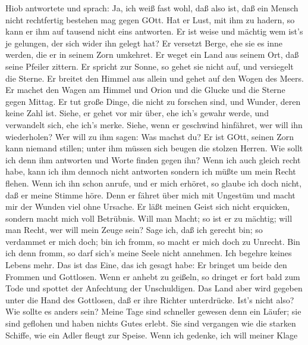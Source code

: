  Hiob antwortete und sprach:  Ja, ich weiß fast
wohl, daß also ist, daß ein Mensch nicht rechtfertig bestehen mag gegen
GOtt.  Hat er Lust, mit ihm zu hadern, so kann er ihm auf
tausend nicht eins antworten.  Er ist weise und mächtig wem
ist's je gelungen, der sich wider ihn gelegt hat?  Er
versetzt Berge, ehe sie es inne werden, die er in seinem Zorn umkehret.
 Er weget ein Land aus seinem Ort, daß seine Pfeiler
zittern.  Er spricht zur Sonne, so gehet sie nicht auf, und
versiegelt die Sterne.  Er breitet den Himmel aus allein und
gehet auf den Wogen des Meers.  Er machet den Wagen am
Himmel und Orion und die Glucke und die Sterne gegen Mittag.
 Er tut große Dinge, die nicht zu forschen sind, und
Wunder, deren keine Zahl ist.  Siehe, er gehet vor mir
über, ehe ich's gewahr werde, und verwandelt sich, ehe ich's merke.
 Siehe, wenn er geschwind hinfähret, wer will ihn
wiederholen? Wer will zu ihm sagen: Was machst du?  Er ist
GOtt, seinen Zorn kann niemand stillen; unter ihm müssen sich beugen die
stolzen Herren.  Wie sollt ich denn ihm antworten und Worte
finden gegen ihn?  Wenn ich auch gleich recht habe, kann
ich ihm dennoch nicht antworten sondern ich müßte um mein Recht flehen.
 Wenn ich ihn schon anrufe, und er mich erhöret, so glaube
ich doch nicht, daß er meine Stimme höre.  Denn er fähret
über mich mit Ungestüm und macht mir der Wunden viel ohne Ursache.
 Er läßt meinen Geist sich nicht erquicken, sondern macht
mich voll Betrübnis.  Will man Macht; so ist er zu mächtig;
will man Recht, wer will mein Zeuge sein?  Sage ich, daß
ich gerecht bin; so verdammet er mich doch; bin ich fromm, so macht er
mich doch zu Unrecht.  Bin ich denn fromm, so darf sich's
meine Seele nicht annehmen. Ich begehre keines Lebens mehr.
 Das ist das Eine, das ich gesagt habe: Er bringet um beide
den Frommen und Gottlosen.  Wenn er anhebt zu geißeln, so
dringet er fort bald zum Tode und spottet der Anfechtung der
Unschuldigen.  Das Land aber wird gegeben unter die Hand
des Gottlosen, daß er ihre Richter unterdrücke. Ist's nicht also? Wie
sollte es anders sein?  Meine Tage sind schneller gewesen
denn ein Läufer; sie sind geflohen und haben nichts Gutes erlebt.
 Sie sind vergangen wie die starken Schiffe, wie ein Adler
fleugt zur Speise.  Wenn ich gedenke, ich will meiner Klage
